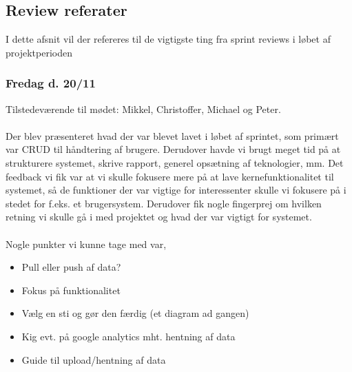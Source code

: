 \subsection{Review referater}
I dette afsnit vil der refereres til de vigtigste ting fra sprint reviews i løbet af projektperioden
\subsubsection{Fredag d. 20/11}
Tilstedeværende til mødet: Mikkel, Christoffer, Michael og Peter.
\\\\
Der blev præsenteret hvad der var blevet lavet i løbet af sprintet, som primært var CRUD til håndtering af brugere. Derudover havde vi brugt meget tid på at strukturere systemet, skrive rapport, generel opsætning af teknologier, mm.
Det feedback vi fik var at vi skulle fokusere mere på at lave kernefunktionalitet til systemet, så de funktioner der var vigtige for interessenter skulle vi fokusere på i stedet for f.eks. et brugersystem.
Derudover fik nogle fingerprej om hvilken retning vi skulle gå i med projektet og hvad der var vigtigt for systemet.
\\\\
Nogle punkter vi kunne tage med var,
\begin{itemize}
    \item{Pull eller push af data?}
    \item{Fokus på funktionalitet}
    \item{Vælg en sti og gør den færdig (et diagram ad gangen)}
    \item{Kig evt. på google analytics mht. hentning af data}
    \item{Guide til upload/hentning af data}
\end{itemize}
